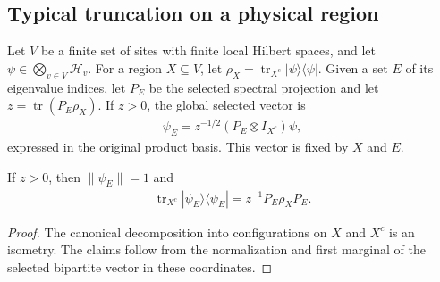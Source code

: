\subsection{Typical truncation on a physical region}

\begin{definition}
\label{def:entropy_regional_typical_state}
\leanok
{}
Let $V$ be a finite set of sites with finite local Hilbert spaces, and let
$\psi\in\bigotimes_{v\in V}\mathcal H_v$. For a region $X\subseteq V$, let
$\rho_X=\operatorname{tr}_{X^c}|\psi\rangle\langle\psi|$.
Given a set $E$ of its eigenvalue indices, let $P_E$ be the selected spectral
projection and let $z=\operatorname{tr}(P_E\rho_X)$.
If $z>0$, the global selected vector is
\begin{align}
 \psi_E=z^{-1/2}(P_E\otimes I_{X^c})\psi,
\end{align}
expressed in the original product basis. This vector is fixed by $X$ and $E$.
\end{definition}

\begin{theorem}
\label{thm:entropy_regional_typical_state_normalization}
\leanok
{}
If $z>0$, then $\|\psi_E\|=1$ and
\begin{align}
 \operatorname{tr}_{X^c}|\psi_E\rangle\langle\psi_E|
   =z^{-1}P_E\rho_XP_E.
\end{align}
\end{theorem}
\begin{proof}
\leanok
The canonical decomposition into configurations on $X$ and $X^c$ is an isometry.
The claims follow from the normalization and first marginal of the selected
bipartite vector in these coordinates.
\end{proof}

